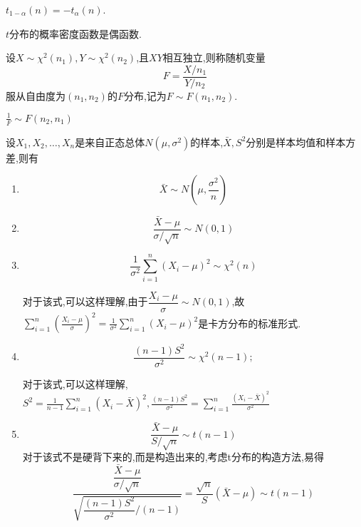 $t_{1-\alpha}(n)=-t_\alpha(n)$.

$t$分布的概率密度函数是偶函数.

\begin{definition}
    设$X\sim \chi^2(n_1),Y\sim \chi^2(n_2)$,且$XY$相互独立,则称随机变量
    \begin{equation*}
        F=\frac{X/n_1}{Y/n_2}
    \end{equation*}
    服从自由度为$(n_1,n_2)$的$F$分布,记为$F\sim F(n_1,n_2)$.
\end{definition}
$\frac{1}{F}\sim F(n_2,n_1)$

设$X_1,X_2,\dotsc,X_n$是来自正态总体$N(\mu,\sigma^2)$的样本,$\bar{X},S^2$分别是样本均值和样本方差,则有
\begin{enumerate}
    \item \begin{equation*}
    \bar {X}\sim N(\mu,\frac{\sigma^2}{n})  
    \end{equation*}
    \item \begin{equation*}
    \frac{\bar{X}-\mu}{\sigma/\sqrt{n}} \sim N(0,1)
    \end{equation*}
    \item \begin{equation*}
    \frac{1}{\sigma^2}\sum^{n}_{i=1}(X_i-\mu)^2\sim \chi^2(n)
    \end{equation*}

    对于该式,可以这样理解,由于$\dfrac{X_i-\mu}{\sigma}\sim N(0,1)$,故$\displaystyle \sum_{i=1}^{n} \left(\frac{X_i-\mu}{\sigma}\right) ^2=\frac{1}{\sigma^2}\sum^{n}_{i=1}(X_i-\mu)^2$是卡方分布的标准形式.
    \item \begin{equation}
        \dfrac{(n-1)S^2}{\sigma^2}\sim \chi^2(n-1);
    \end{equation}

    对于该式,可以这样理解,$\displaystyle S^2=\frac{1}{n-1}\sum_{i=1}^{n}(X_i-\bar{X})^2,\frac{(n-1)S^2}{\sigma^2}=\sum_{i=1}^{n}\frac{(X_i-\bar{X})^2}{\sigma^2}$
    \item \begin{equation*}
        \frac{\bar{X}-\mu}{S/\sqrt{n}}\sim t(n-1)
    \end{equation*}
    对于该式不是硬背下来的,而是构造出来的,考虑t分布的构造方法,易得
    \begin{equation}
        \frac{\dfrac{\bar{X}-\mu}{\sigma/\sqrt{n}} }{\sqrt{\dfrac{(n-1)S^2}{\sigma^2}/(n-1)}}=\frac{\sqrt{n}}{S}(\bar{X}-\mu)\sim t(n-1)
    \end{equation}
\end{enumerate}

